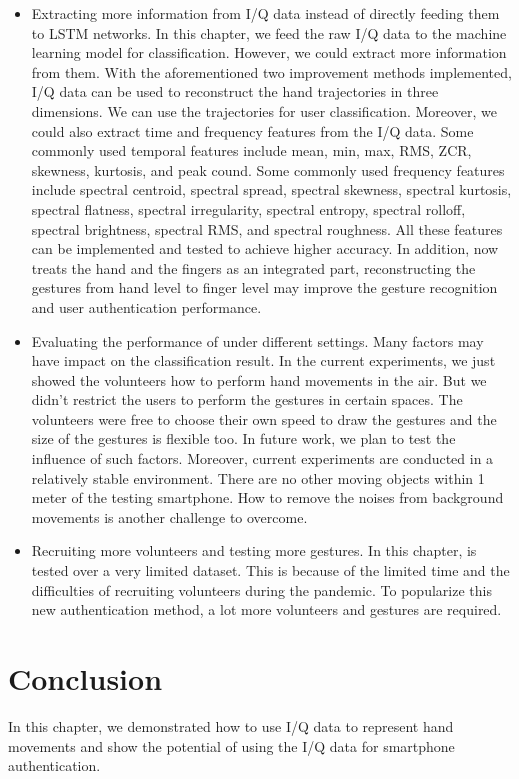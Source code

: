 \begin{itemize}
	\item Extracting more information from I/Q data instead of directly feeding them to LSTM networks. In this chapter, we feed the raw I/Q data to the machine learning model for classification. However, we could extract more information from them. With the aforementioned two improvement methods implemented, I/Q data can be used to reconstruct the hand trajectories in three dimensions. We can use the trajectories for user classification. Moreover, we could also extract time and frequency features from the I/Q data. Some commonly used temporal features include mean, min, max, RMS, ZCR, skewness, kurtosis, and peak cound. Some commonly used frequency features include spectral centroid, spectral spread,  spectral skewness,  spectral kurtosis,  spectral flatness, spectral irregularity, spectral entropy, spectral rolloff,	spectral brightness, 
	spectral RMS, and  spectral roughness. All these features can be implemented and tested to achieve higher accuracy. In addition, {\uu} now treats the hand and the fingers as an integrated part, reconstructing the gestures from hand level to finger level may improve the gesture recognition and user authentication performance.
	
	
	
	\item Evaluating the performance of {\uu} under different settings. Many factors may have impact on the classification result. In the current experiments, we just showed the volunteers how to perform hand movements in the air. But we didn't restrict the users to perform the gestures in certain spaces. The volunteers were free to choose their own speed to draw the gestures and the size of the gestures is flexible too. In future work, we plan to test the influence of such factors. Moreover, current experiments are conducted in a relatively stable environment. There are no other moving objects within 1 meter of the testing smartphone. How to remove the noises from background movements is another challenge to overcome.
	
	\item Recruiting more volunteers and testing more gestures. In this chapter, {\uu} is tested over a very limited dataset. This is because of the limited time and the difficulties of recruiting volunteers during the pandemic. To popularize this new authentication method, a lot more volunteers and gestures are required. 
	
\end{itemize}







\section{Conclusion}
In this chapter, we demonstrated how to use I/Q data to represent hand movements and show the potential of using the I/Q data for smartphone authentication. 